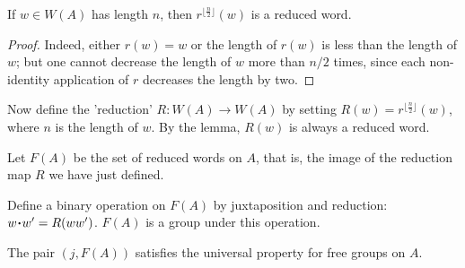 \begin{lemma}
If $w \in W(A)$ has length $n$, then $r^{\lfloor \frac{n}{2} \rfloor}(w)$ is a reduced word.
\end{lemma}

\begin{proof}
Indeed, either $r(w) = w$ or the length of $r(w)$ is less than the length of $w$; but one cannot decrease the length of $w$ more
than $n/2$ times, since each non-identity application of $r$ decreases the length by two.
\end{proof}

Now define the 'reduction' $R : W(A) \rightarrow W(A)$ by setting $R(w) = r^{\lfloor \frac{n}{2} \rfloor}(w)$, where $n$ is the length of $w$.
By the lemma, $R(w)$ is always a reduced word.

Let $F(A)$ be the set of reduced words on $A$, that is, the image of the reduction map $R$ we have just defined.

Define a binary operation on $F(A)$ by juxtaposition and reduction: $w \LargerCdot w' = R(ww')$. $F(A)$ is a group under this operation.

\begin{proposition}
The pair $(j, F(A))$ satisfies the universal property for free groups on $A$.
\end{proposition}